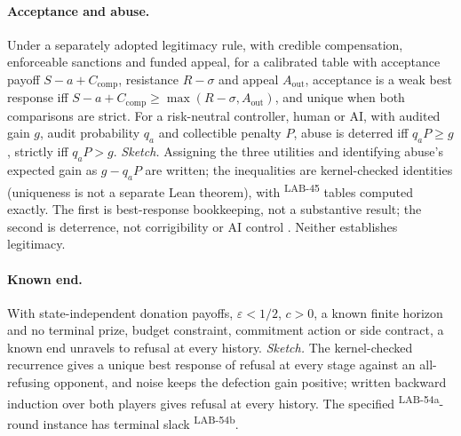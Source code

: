 \documentclass[pdflatex,sn-basic]{sn-jnl}%
\newcommand{\rec}[1]{\ifannotated\textsuperscript{\textcolor{blue!60!black}{\tiny#1}}\fi}
\begin{document}
\begin{appendices}
\paragraph{Acceptance and abuse.} Under a separately adopted legitimacy rule, with credible compensation, enforceable sanctions and funded appeal, for a calibrated table with acceptance payoff $S-a+C_{\mathrm{comp}}$, resistance $R-\sigma$ and appeal $A_{\mathrm{out}}$, acceptance is a weak best response iff $S-a+C_{\mathrm{comp}}\ge\max(R-\sigma,A_{\mathrm{out}})$, and unique when both comparisons are strict. For a risk-neutral controller, human or AI, with audited gain $g$, audit probability $q_a$ and collectible penalty $P$, abuse is deterred iff $q_aP\ge g$, strictly iff $q_aP>g$. \emph{Sketch.} Assigning the three utilities and identifying abuse's expected gain as $g-q_aP$ are written; the inequalities are kernel-checked identities (uniqueness is not a separate Lean theorem), with \numDElevenTables\rec{LAB-45} tables computed exactly. The first is best-response bookkeeping, not a substantive result; the second is deterrence, not corrigibility or AI control \citep{greenblatt2024control}. Neither establishes legitimacy.

\paragraph{Known end.} With state-independent donation payoffs, $\varepsilon<1/2$, $c>0$, a known finite horizon and no terminal prize, budget constraint, commitment action or side contract, a known end unravels to refusal at every history. \emph{Sketch.} The kernel-checked recurrence gives a unique best response of refusal at every stage against an all-refusing opponent, and noise keeps the defection gain positive; written backward induction over both players gives refusal at every history. The specified \numDThreeHorizon\rec{LAB-54a}-round instance has terminal slack \numDThreeTerminalSlack\rec{LAB-54b}.


\end{appendices}
\end{document}

